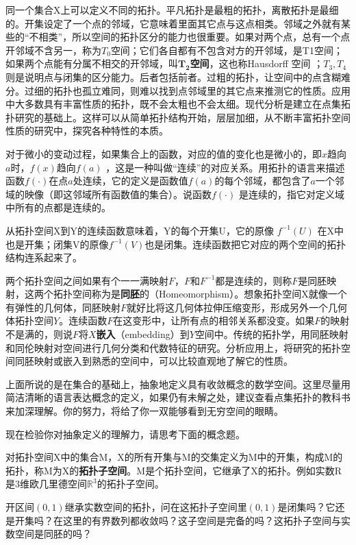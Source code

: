 同一个集合X上可以定义不同的拓扑。平凡拓扑是最粗的拓扑，离散拓扑是最细的。开集设定了一个点的邻域，它意味着里面其它点与这点相类。邻域之外就有某些的“不相类”，所以空间的拓扑区分的能力也很重要。如果对两个点，总有一个点开邻域不含另一，称为$ T_0 $空间；它们各自都有不包含对方的开邻域，是T1空间；如果两个点能有分属不相交的开邻域，叫$ \bm{T_2} $\textbf{空间}，这也称Hausdorff 空间 ；$ T_3, T_4 $则是说明点与闭集的区分能力。后者包括前者。过粗的拓扑，让空间中的点含糊难分。过细的拓扑也孤立难同，则难以找到点邻域里的其它点来推测它的性质。应用中大多数具有丰富性质的拓扑，既不会太粗也不会太细。现代分析是建立在点集拓扑研究的基础上。这样可以从简单拓扑结构开始，层层加细，从不断丰富拓扑空间性质的研究中，探究各种特性的本质。

对于微小的变动过程，如果集合上的函数，对应的值的变化也是微小的，即$ x $趋向$ a $时，$ f(x) $趋向$ f(a) $ ，这是一种叫做“连续”的对应关系。用拓扑的语言来描述函数$ f(\cdot) $在点$ a $处连续，它的定义是函数值$ f(a) $的每个邻域，都包含了$ a $一个邻域的映像（即这邻域所有函数值的集合）。说函数$ f(\cdot) $ 是连续的，指它对定义域中所有的点都是连续的。

从拓扑空间X到Y的连续函数意味着，Y的每个开集U，它的原像 $ f^{-1}(U) $ 在X中也是开集；闭集V的原像$ f^{-1}(V) $也是闭集。连续函数把它对应的两个空间的拓扑结构连系起来了。

两个拓扑空间之间如果有个一一满映射$ F $，$ F $和$ F^{-1} $都是连续的，则称$ F $是同胚映射，这两个拓扑空间称为是\textbf{同胚}的（Homeomorphism）。想象拓扑空间X就像一个有弹性的几何体，同胚映射$ F $就好比将这几何体拉伸压缩变形，形成另外一个几何体拓扑空间$ Y $。连续函数$ F $在这变形中，让所有点的相邻关系都没变。如果$ F $的映射不是满的，则说$ F $将$ X $\textbf{嵌入}（embedding）到$ Y $空间中。传统的拓扑学，用同胚映射和同伦映射对空间进行几何分类和代数特征的研究。分析应用上，将研究的拓扑空间同胚映射或嵌入到熟悉的空间中，可以比较直观地了解它的性质。

上面所说的是在集合的基础上，抽象地定义具有收敛概念的数学空间。这里尽量用简洁清晰的语言表达概念的定义，如果仍有未解之处，建议查看点集拓扑的教科书来加深理解。你的努力，将给了你一双能够看到无穷空间的眼睛。

现在检验你对抽象定义的理解力，请思考下面的概念题。

对拓扑空间X中的集合M，X的所有开集与M的交集定义为M中的开集，构成M的拓扑，称M为X的\textbf{拓扑子空间}。M是个拓扑空间，它继承了X的拓扑。例如实数R是3维欧几里德空间$ \mathbb{R}^3 $的拓扑子空间。

开区间$ (0, 1) $继承实数空间的拓扑，问在这拓扑子空间里$ (0, 1) $是闭集吗？它还是开集吗？在这里的有界数列都收敛吗？这子空间是完备的吗？这拓扑子空间与实数空间是同胚的吗？

